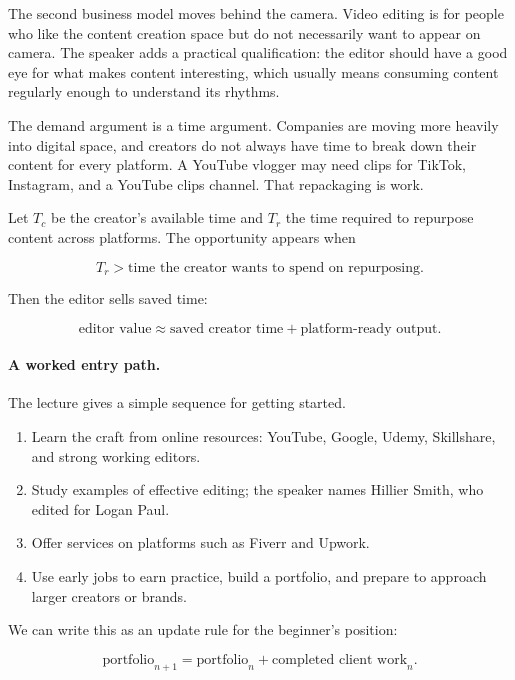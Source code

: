 The second business model moves behind the camera. Video editing is for people who like the content creation space but do not necessarily want to appear on camera. The speaker adds a practical qualification: the editor should have a good eye for what makes content interesting, which usually means consuming content regularly enough to understand its rhythms.

The demand argument is a time argument. Companies are moving more heavily into digital space, and creators do not always have time to break down their content for every platform. A YouTube vlogger may need clips for TikTok, Instagram, and a YouTube clips channel. That repackaging is work.

Let \(T_c\) be the creator's available time and \(T_r\) the time required to repurpose content across platforms. The opportunity appears when

\begin{equation}
T_r > \text{time the creator wants to spend on repurposing}.
\end{equation}

Then the editor sells saved time:

\begin{equation}
\text{editor value}
\approx
\text{saved creator time}
+
\text{platform-ready output}.
\end{equation}

\paragraph{A worked entry path.}
The lecture gives a simple sequence for getting started.

\begin{enumerate}
\item Learn the craft from online resources: YouTube, Google, Udemy, Skillshare, and strong working editors.
\item Study examples of effective editing; the speaker names Hillier Smith, who edited for Logan Paul.
\item Offer services on platforms such as Fiverr and Upwork.
\item Use early jobs to earn practice, build a portfolio, and prepare to approach larger creators or brands.
\end{enumerate}

We can write this as an update rule for the beginner's position:

\begin{equation}
\text{portfolio}_{n+1}
=
\text{portfolio}_{n}
+
\text{completed client work}_{n}.
\end{equation}

